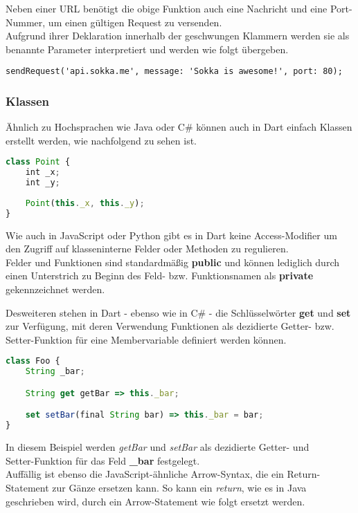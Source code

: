 Neben einer URL benötigt die obige Funktion auch eine Nachricht und eine Port-Nummer,
um einen gültigen Request zu versenden.\\
Aufgrund ihrer Deklaration innerhalb der geschwungen Klammern
werden sie als benannte Parameter interpretiert und werden wie folgt übergeben.

\begin{lstlisting}
sendRequest('api.sokka.me', message: 'Sokka is awesome!', port: 80);
\end{lstlisting}

\subsubsection{Klassen}

Ähnlich zu Hochsprachen wie Java oder C\# können auch in Dart einfach Klassen
erstellt werden, wie nachfolgend zu sehen ist.

\begin{lstlisting}[language=JavaScript]
class Point {
    int _x;
    int _y;
    
    Point(this._x, this._y);
}
\end{lstlisting}

Wie auch in JavaScript oder Python gibt es in Dart keine Access-Modifier um den Zugriff
auf klasseninterne Felder oder Methoden zu regulieren.\\
Felder und Funktionen sind standardmäßig \textbf{public} und können lediglich durch
einen Unterstrich zu Beginn des Feld- bzw. Funktionsnamen als \textbf{private} gekennzeichnet
werden.

Desweiteren stehen in Dart - ebenso wie in C\# - die Schlüsselwörter \textbf{get} und 
\textbf{set} zur Verfügung, mit deren Verwendung Funktionen als dezidierte Getter- bzw.
Setter-Funktion für eine Membervariable definiert werden können.

\begin{lstlisting}[language=JavaScript]
class Foo {
    String _bar;

    String get getBar => this._bar;

    set setBar(final String bar) => this._bar = bar;
}
\end{lstlisting}

In diesem Beispiel werden \textit{getBar} und \textit{setBar} als dezidierte Getter- und\\
Setter-Funktion für das Feld \textbf{\_bar} festgelegt.\\
Auffällig ist ebenso die JavaScript-ähnliche Arrow-Syntax, die ein Return-Statement
zur Gänze ersetzen kann.
So kann ein \textit{return}, wie es in Java geschrieben wird, durch ein Arrow-Statement wie folgt
ersetzt werden.

